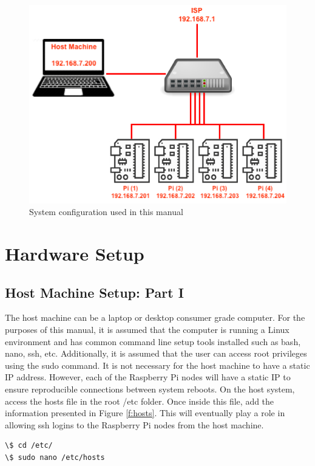 \documentclass[sigconf]{acmart}
\begin{document}
\begin{figure}[!ht]
  \centering\includegraphics[width=\columnwidth]{images/system.png}
  \caption{System configuration used in this manual}\label{f:system}
\end{figure}

\section{Hardware Setup}

\subsection{Host Machine Setup: Part I}

The host machine can be a laptop or desktop consumer grade computer. For the purposes of this manual, it is assumed that the 
computer is running a Linux environment and has common command line setup tools installed such as bash, nano, ssh, etc. 
Additionally, it is assumed that the user can access root privileges using the sudo command. It is not necessary for the 
host machine to have a static IP address. However, each of the Raspberry Pi nodes will have a static IP to ensure 
reproducible connections between system reboots. On the host system, access the hosts file in the root /etc folder. Once 
inside this file, add the information presented in Figure \ref{f:hosts}. This will eventually play a role in allowing ssh 
logins to the Raspberry Pi nodes from the host machine.

\begin{lstlisting}
\$ cd /etc/
\$ sudo nano /etc/hosts
\end{lstlisting}
\end{document}
